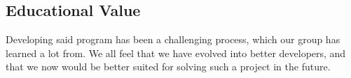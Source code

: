 \subsection{Educational Value}
Developing said program has been a challenging process, which our group has learned a lot from. We all feel that we have evolved into better developers, and that we now would be better suited for solving such a project in the future. 
